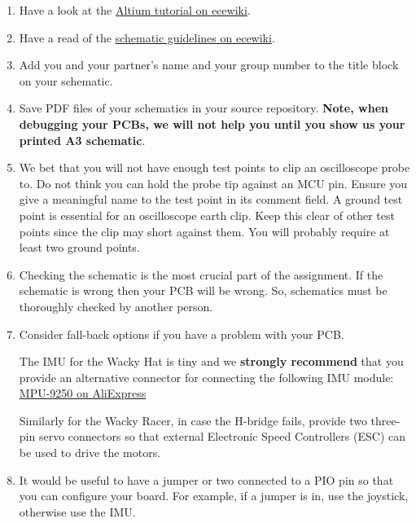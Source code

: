 \documentclass[11pt, a4paper]{article}
\begin{document}
\begin{enumerate}
\item Have a look at the
  \href{http://ecewiki.elec.canterbury.ac.nz/mediawiki/index.php/ENCE461_Altium_tutorial}{Altium
    tutorial on ecewiki}.

\item Have a read of the
  \href{http://ecewiki.elec.canterbury.ac.nz/mediawiki/index.php/Schematic_guidelines}{schematic
    guidelines on ecewiki}.

\item Add you and your partner's name and your group number to the
  title block on your schematic.

\item Save PDF files of your schematics in your source repository.
  \textbf{Note, when debugging your PCBs, we will not help you until
    you show us your printed A3 schematic}.

\item We bet that you will not have enough test points to clip an oscilloscope
  probe to.  Do not think you can hold the probe tip against an MCU pin.  Ensure
  you give a meaningful name to the test point in its comment field.  A ground
  test point is essential for an oscilloscope earth clip. Keep this clear of
  other test points since the clip may short against them.  You will probably
  require at least two ground points.

\item Checking the schematic is the most crucial part of the
  assignment.  If the schematic is wrong then your PCB will be wrong.
  So, schematics must be thoroughly checked by another person.

\item Consider fall-back options if you have a problem with your PCB.

  The IMU for the Wacky Hat is tiny and we \textbf{strongly recommend} that you
  provide an alternative connector for connecting the following IMU module:
  \href{https://www.aliexpress.com/item/SPI-IIC-MPU9250-MPU-9250-MPU-9250-9-Axis-Attitude-Gyro-Accelerator-Magnetometer-Sensor-Module-MPU9250/32216818498.html?spm=a2g0s.9042311.0.0.WKvtEm}{MPU-9250 on AliExpress}

  Similarly for the Wacky Racer, in case the H-bridge fails, provide two
  three-pin servo connectors so that external Electronic Speed
  Controllers (ESC) can be used to drive the motors.

\item It would be useful to have a jumper or two connected to a PIO
  pin so that you can configure your board.  For example, if a jumper
  is in, use the joystick, otherwise use the IMU.

\end{enumerate}
\end{document}
